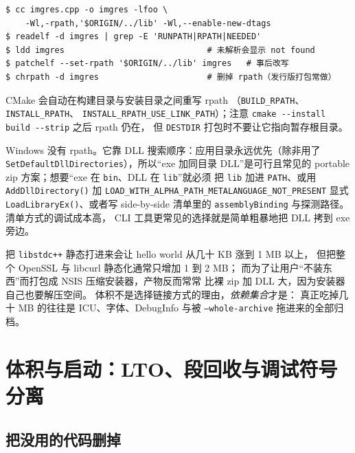 \documentclass[12pt,a4paper,fontset=fandol]{ctexbook}
\newcommand{\Fn}[1]{\texttt{#1()}}
\newcommand{\Tp}[1]{\texttt{#1}}
\begin{document}
\begin{lstlisting}[style=shellstyle,caption={可搬运目录的 rpath 写法与检查}]
$ cc imgres.cpp -o imgres -lfoo \
    -Wl,-rpath,'$ORIGIN/../lib' -Wl,--enable-new-dtags
$ readelf -d imgres | grep -E 'RUNPATH|RPATH|NEEDED'
$ ldd imgres                             # 未解析会显示 not found
$ patchelf --set-rpath '$ORIGIN/../lib' imgres   # 事后改写
$ chrpath -d imgres                      # 删掉 rpath（发行版打包常做）
\end{lstlisting}

CMake 会自动在构建目录与安装目录之间重写 rpath
（\Tp{BUILD\_RPATH}、\Tp{INSTALL\_RPATH}、
\Tp{INSTALL\_RPATH\_USE\_LINK\_PATH}）；注意
\lstinline|cmake --install build --strip| 之后 rpath 仍在，
但 \Tp{DESTDIR} 打包时不要让它指向暂存根目录。

Windows 没有 rpath。它靠 DLL 搜索顺序：应用目录永远优先（除非用了
\Tp{SetDefaultDllDirectories}），所以``exe 加同目录 DLL''是可行且常见的
portable zip 方案；想要``exe 在 \Tp{bin}、DLL 在 \Tp{lib}''就必须
把 \Tp{lib} 加进 \Tp{PATH}、或用 \Fn{AddDllDirectory}
加 \Tp{LOAD\_WITH\_ALPHA\_PATH\_METALANGUAGE\_NOT\_PRESENT} 显式
\Fn{LoadLibraryEx}、或者写 side-by-side 清单里的
\Tp{assemblyBinding} 与探测路径。清单方式的调试成本高，
CLI 工具更常见的选择就是简单粗暴地把 DLL 拷到 exe 旁边。

\begin{note}[title={一个反直觉的事实：动态链接常让产物更大}]
把 \Tp{libstdc++} 静态打进来会让 hello world 从几十 KB 涨到 1 MB 以上，
但把整个 OpenSSL 与 libcurl 静态化通常只增加 1 到 2 MB；
而为了让用户``不装东西''而打包成 NSIS 压缩安装器，产物反而常常
比裸 zip 加 DLL 大，因为安装器自己也要解压空间。
体积不是选择链接方式的理由，\emph{依赖集合}才是：
真正吃掉几十 MB 的往往是 ICU、字体、DebugInfo 与被
\Tp{--whole-archive} 拖进来的全部归档。
\end{note}

\section{体积与启动：LTO、段回收与调试符号分离}

\subsection{把没用的代码删掉}
\end{document}
